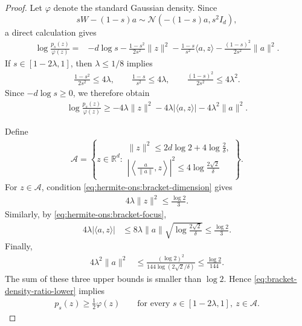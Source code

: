 \documentclass{article}
\theoremstyle{plain}
\theoremstyle{definition}
\theoremstyle{plain}
\newcommand{\R}{\mathbb R}
\newcommand{\cN}{\mathcal N}
\begin{document}
\begin{proof}
    Let $\varphi$ denote the standard Gaussian density. Since
    \[
        sW-(1-s)a\sim\cN(-(1-s)a,s^2I_d),
    \]
    a direct calculation gives
    \begin{align}
        \log\frac{p_s(z)}{\varphi(z)}
        ={} &
        -d\log s
        -\frac{1-s^2}{2s^2}\|z\|^2
        -\frac{1-s}{s^2}\langle a,z\rangle
        -\frac{(1-s)^2}{2s^2}\|a\|^2.
        \label{eq:bracket-density-ratio}
    \end{align}
    If $s\in[1-2\lambda,1]$, then $\lambda\leq1/8$ implies
    \begin{align}
        \frac{1-s^2}{2s^2}\leq4\lambda,
        \qquad
        \frac{1-s}{s^2}\leq4\lambda,
        \qquad
        \frac{(1-s)^2}{2s^2}\leq4\lambda^2.
    \end{align}
    Since $-d\log s\geq0$, we therefore obtain
    \begin{align}
        \log\frac{p_s(z)}{\varphi(z)}
        \geq
        -4\lambda\|z\|^2
        -4\lambda|\langle a,z\rangle|
        -4\lambda^2\|a\|^2.
        \label{eq:bracket-density-ratio-lower}
    \end{align}

    Define
    \begin{align}
        \mathcal A
        =
        \left\{
        z\in\R^d:
        \begin{array}{l}
            \displaystyle
            \|z\|^2
            \leq
            2d\log 2+4\log\frac{2}{\delta},
            \\[0.2cm]
            \displaystyle
            \left|
            \left\langle\frac{a}{\|a\|},z\right\rangle
            \right|^2
            \leq
            4\log\frac{2\sqrt{2}}{\delta}
        \end{array}
        \right\}.
        \label{eq:bracket-set}
    \end{align}
    For $z\in\mathcal A$, condition
    \eqref{eq:hermite-ons:bracket-dimension} gives
    \begin{align}
        4\lambda\|z\|^2
        \leq
        \frac{\log2}{3}.
    \end{align}
    Similarly, by \eqref{eq:hermite-ons:bracket-focus},
    \begin{align}
        4\lambda|\langle a,z\rangle|
         & \leq
        8\lambda\|a\|
        \sqrt{\log\frac{2\sqrt2}{\delta}}
        \leq
        \frac{\log2}{3}.
    \end{align}
    Finally,
    \begin{align}
        4\lambda^2\|a\|^2
         & \leq
        \frac{(\log2)^2}
        {144\log(2\sqrt2/\delta)}
        \leq
        \frac{\log2}{144}.
    \end{align}
    The sum of these three upper bounds is smaller than $\log2$.
    Hence \eqref{eq:bracket-density-ratio-lower} implies
    \begin{align}
        p_s(z)\geq\frac12\varphi(z)
        \qquad
        \text{for every }
        s\in[1-2\lambda,1],\ z\in\mathcal A.
        \label{eq:bracket-density-comparison}
    \end{align}


\end{proof}
\end{document}
